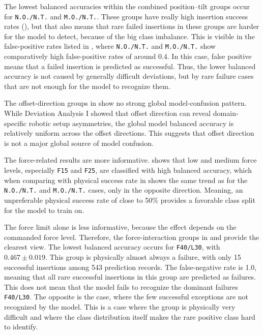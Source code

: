 The lowest balanced accuracies within the combined position--tilt groups occur for \texttt{N.O./N.T.} and \texttt{M.O./N.T.}. These groups have really high insertion success rates (), but that also means that rare failed insertions in these groups are harder for the model to detect, because of the big class imbalance. This is visible in the false-positive rates listed in , where \texttt{N.O./N.T.} and \texttt{M.O./N.T.} show comparatively high false-positive rates of around 0.4. In this case, false positive means that a failed insertion is predicted as successful. Thus, the lower balanced accuracy is not caused by generally difficult deviations, but by rare failure cases that are not enough for the model to recognize them.

The offset-direction groups in  show no strong global model-confusion pattern. While Deviation Analysis I showed that offset direction can reveal domain-specific robotic setup asymmetries, the global model balanced accuracy is relatively uniform across the offset directions. This suggests that offset direction is not a major global source of model confusion.

The force-related results are more informative.  shows that low and medium force levels, especially \texttt{F15} and \texttt{F25}, are classified with high balanced accuracy, which when comparing with physical success rate in  shows the same trend as for the \texttt{N.O./N.T.} and \texttt{M.O./N.T.} cases, only in the opposite direction. Meaning, an unpreferable physical success rate of close to 50\%  provides a favorable class split for the model to train on.

The force limit alone is less informative, because the effect depends on the commanded force level. Therefore, the force-interaction groups in  and  provide the clearest view. The lowest balanced accuracy occurs for \texttt{F40/L30}, with $0.467 \pm 0.019$. This group is physically almost always a failure, with only 15 successful insertions among 543 prediction records. The false-negative rate is 1.0, meaning that all rare successful insertions in this group are predicted as failures.
This does not mean that the model fails to recognize the dominant failures \texttt{F40/L30}. The opposite is the case, where the few successful exceptions are not recognized by the model. This is a case where the group is physically very difficult and where the class distribution itself makes the rare positive class hard to identify.

